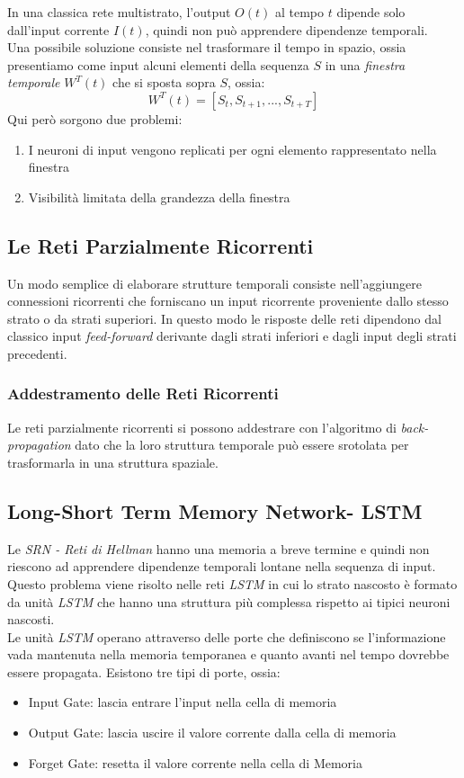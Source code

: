 In una classica rete multistrato, l'output \(O(t)\) al tempo \(t\) dipende solo dall'input corrente \(I(t)\), quindi non può apprendere dipendenze temporali.\\
Una possibile soluzione consiste nel trasformare il tempo in spazio, ossia presentiamo come input alcuni elementi della sequenza \(S\) in una \textit{finestra temporale} \(W^T(t)\) che si sposta sopra \(S\), ossia:
\[W^T(t)=[S_t, S_{t+1}, ... , S_{t+T}]\]
Qui però sorgono due problemi:
\begin{enumerate}
    \item I neuroni di input vengono replicati per ogni elemento rappresentato nella finestra
    \item Visibilità limitata della grandezza della finestra
\end{enumerate}
\subsection{Le Reti Parzialmente Ricorrenti}
Un modo semplice di elaborare strutture temporali consiste nell'aggiungere connessioni ricorrenti che forniscano un input ricorrente proveniente dallo stesso strato o da strati superiori. In questo modo le risposte delle reti dipendono dal classico input \textit{feed-forward} derivante dagli strati inferiori e dagli input degli strati precedenti.\\
\subsubsection{Addestramento delle Reti Ricorrenti}
Le reti parzialmente ricorrenti si possono addestrare con l'algoritmo di \textit{back-propagation} dato che la loro struttura temporale può essere srotolata per trasformarla in una struttura spaziale.

\subsection{Long-Short Term Memory Network- LSTM}
Le \textit{SRN - Reti di Hellman} hanno una memoria a breve termine e quindi non riescono ad apprendere dipendenze temporali lontane nella sequenza di input. Questo problema viene risolto nelle reti \textit{LSTM} in cui lo strato nascosto è formato da unità \textit{LSTM} che hanno una struttura più complessa rispetto ai tipici neuroni nascosti.\\
Le unità \textit{LSTM} operano attraverso delle porte che definiscono se l'informazione vada mantenuta nella memoria temporanea e quanto avanti nel tempo dovrebbe essere propagata. Esistono tre tipi di porte, ossia:
\begin{itemize}
    \item Input Gate: lascia entrare l'input nella cella di memoria
    \item Output Gate: lascia uscire il valore corrente dalla cella di memoria
    \item Forget Gate: resetta il valore corrente nella cella di Memoria
\end{itemize}

